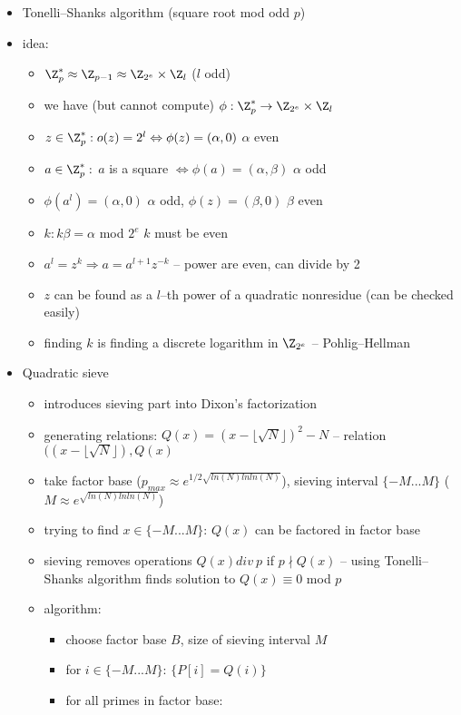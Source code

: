 \begin{itemize}
	\item Tonelli--Shanks algorithm (square root mod odd $p$)
	\item idea:
	\begin{itemize}
		\item $\Z^*_p \approx \Z_{p-1} \approx \Z_{2^e} \times \Z_l$ ($l$ odd) 
		\item we have (but cannot compute) $\phi: \Z_p^* \rightarrow \Z_{2^e} \times \Z_l$
		\item $z\in\Z_p^*: o(z) = 2^l \Leftrightarrow \phi(z)=(\alpha,0)$ $\alpha$ even
		\item $a\in\Z_p^*:$ $a$ is a square $\Leftrightarrow \phi(a) = (\alpha,\beta)$ $\alpha$ odd
		\item $\phi(a^l) = (\alpha,0)$ $\alpha$ odd, $\phi(z) = (\beta,0)$ $\beta$ even
		\item $k: k\beta=\alpha$ mod $2^e$ $k$ must be even
		\item $a^l=z^k \Rightarrow a = a^{l+1}z^{-k}$ -- power are even, can divide by 2
		\item $z$ can be found as a $l$--th power of a quadratic nonresidue (can be checked easily)
		\item finding $k$ is finding a discrete logarithm in $\Z_{2^e}$ -- Pohlig--Hellman
	\end{itemize}
	\item Quadratic sieve
	\begin{itemize}
		\item introduces sieving part into Dixon's factorization
		\item generating relations: $Q(x) = (x-\lfloor \sqrt{N} \rfloor )^2-N$ -- relation $((x-\lfloor \sqrt{N} \rfloor), Q(x)$
		\item take factor base ($p_{max} \approx e^{1/2\sqrt{ln(N)lnln(N)}}$), sieving interval $\{-M...M\}$ ($M \approx e^{\sqrt{ln(N)lnln(N)}}$)
		\item trying to find $x \in \{-M...M\}$: $Q(x)$ can be factored in factor base
		\item sieving removes operations $Q(x) div\ p$ if $p \nmid Q(x)$ -- using Tonelli--Shanks algorithm finds solution to $Q(x)\equiv0$ mod $p$
		\item algorithm:
		\begin{itemize}
			\item choose factor base $B$, size of sieving interval $M$
			\item for $i \in \{-M...M\}$: $\{P[i]=Q(i)\}$
			\item for all primes in factor base: 

\end{itemize}
\end{itemize}
\end{itemize}

